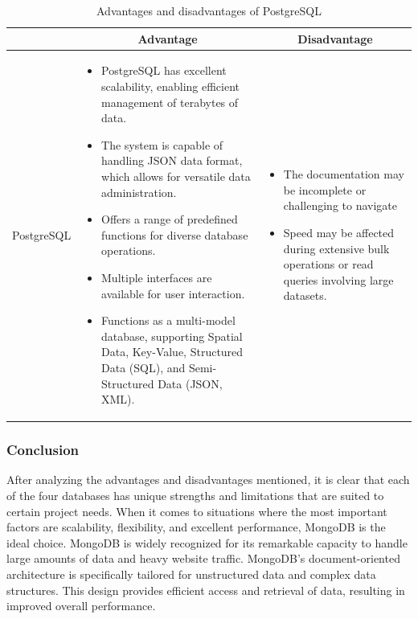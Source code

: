 \begin{table}[H]
    \centering
    \begin{tabular}{| c | p{} | p{} |}
        \hline
        \multicolumn{1}{|c|}{}
        & \multicolumn{1}{c|}{Advantage}
        & \multicolumn{1}{c|}{Disadvantage} \\ \hline
        \multirow{10}{*}{PostgreSQL}     
                &   \begin{itemize}[leftmargin=*,topsep=0pt,partopsep=0pt,parsep=0pt]
                        \item PostgreSQL has excellent scalability, enabling efficient management of terabytes of data.
                        \item The system is capable of handling JSON data format, which allows for versatile data administration.
                        \item Offers a range of predefined functions for diverse database operations.
                        \item Multiple interfaces are available for user interaction.
                        \item Functions as a multi-model database, supporting Spatial Data, Key-Value, Structured Data (SQL), and Semi-Structured Data (JSON, XML).
                    \end{itemize}
                &   \begin{itemize}[leftmargin=*,topsep=0pt,partopsep=0pt,parsep=0pt]
                        \item The documentation may be incomplete or challenging to navigate
                        \item Speed may be affected during extensive bulk operations or read queries involving large datasets.
                    \end{itemize} \\ \hline
    \end{tabular}
    \caption{Advantages and disadvantages of PostgreSQL}
\end{table}

\subsubsection{Conclusion}

After analyzing the advantages and disadvantages mentioned, it is clear that each of the four databases has unique strengths and limitations that are suited to certain project needs. When it comes to situations where the most important factors are scalability, flexibility, and excellent performance, MongoDB is the ideal choice. MongoDB is widely recognized for its remarkable capacity to handle large amounts of data and heavy website traffic. MongoDB's document-oriented architecture is specifically tailored for unstructured data and complex data structures. This design provides efficient access and retrieval of data, resulting in improved overall performance.